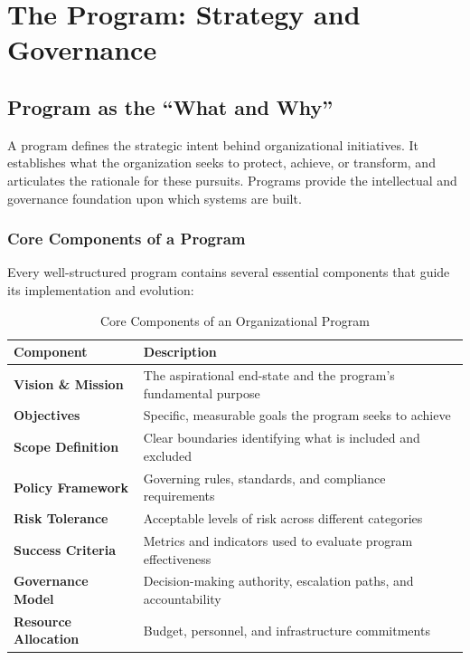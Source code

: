 \documentclass[11pt,letterpaper]{article}
\begin{document}
\section{The Program: Strategy and Governance}

\subsection{Program as the ``What and Why''}

A program defines the strategic intent behind organizational initiatives. It establishes what the organization seeks to protect, achieve, or transform, and articulates the rationale for these pursuits. Programs provide the intellectual and governance foundation upon which systems are built.

\subsubsection{Core Components of a Program}

Every well-structured program contains several essential components that guide its implementation and evolution:

\begin{table}[H]
\centering
\renewcommand{\arraystretch}{1.3}
\begin{tabularx}{\textwidth}{>{\bfseries}l X}
\toprule
\textbf{Component} & \textbf{Description} \\
\midrule
Vision \& Mission & The aspirational end-state and the program's fundamental purpose \\
Objectives & Specific, measurable goals the program seeks to achieve \\
Scope Definition & Clear boundaries identifying what is included and excluded \\
Policy Framework & Governing rules, standards, and compliance requirements \\
Risk Tolerance & Acceptable levels of risk across different categories \\
Success Criteria & Metrics and indicators used to evaluate program effectiveness \\
Governance Model & Decision-making authority, escalation paths, and accountability \\
Resource Allocation & Budget, personnel, and infrastructure commitments \\
\bottomrule
\end{tabularx}
\caption{Core Components of an Organizational Program}
\label{tab:program-components}
\end{table}
\end{document}
